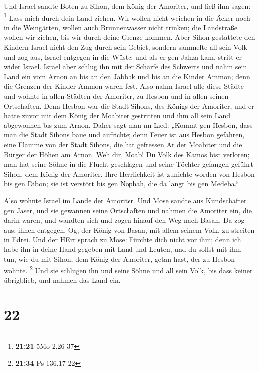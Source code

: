  Und Israel sandte Boten zu Sihon, dem König der
Amoriter, und ließ ihm sagen: \footnote{\textbf{21:21} 5Mo 2,26-37}
 Lass mich durch dein Land ziehen. Wir wollen nicht
weichen in die Äcker noch in die Weingärten, wollen auch Brunnenwasser
nicht trinken; die Landstraße wollen wir ziehen, bis wir durch deine
Grenze kommen.  Aber Sihon gestattete den Kindern Israel
nicht den Zug durch sein Gebiet, sondern sammelte all sein Volk und zog
aus, Israel entgegen in die Wüste; und als er gen Jahza kam, stritt er
wider Israel.  Israel aber schlug ihn mit der Schärfe des
Schwerts und nahm sein Land ein vom Arnon an bis an den Jabbok und bis
an die Kinder Ammon; denn die Grenzen der Kinder Ammon waren fest.
 Also nahm Israel alle diese Städte und wohnte in allen
Städten der Amoriter, zu Hesbon und in allen seinen Ortschaften.
 Denn Hesbon war die Stadt Sihons, des Königs der
Amoriter, und er hatte zuvor mit dem König der Moabiter gestritten und
ihm all sein Land abgewonnen bis zum Arnon.  Daher sagt
man im Lied: „Kommt gen Hesbon, dass man die Stadt Sihons baue und
aufrichte;  denn Feuer ist aus Hesbon gefahren, eine
Flamme von der Stadt Sihons, die hat gefressen Ar der Moabiter und die
Bürger der Höhen am Arnon.  Weh dir, Moab! Du Volk des
Kamos bist verloren; man hat seine Söhne in die Flucht geschlagen und
seine Töchter gefangen geführt Sihon, dem König der Amoriter.
 Ihre Herrlichkeit ist zunichte worden von Hesbon bis gen
Dibon; sie ist verstört bis gen Nophah, die da langt bis gen Medeba.``

 Also wohnte Israel im Lande der Amoriter.
 Und Mose sandte aus Kundschafter gen Jaser, und sie
gewannen seine Ortschaften und nahmen die Amoriter ein, die darin waren,
 und wandten sich und zogen hinauf den Weg nach Basan. Da
zog aus, ihnen entgegen, Og, der König von Basan, mit allem seinem Volk,
zu streiten in Edrei.  Und der HErr sprach zu Mose:
Fürchte dich nicht vor ihm; denn ich habe ihn in deine Hand gegeben mit
Land und Leuten, und du sollst mit ihm tun, wie du mit Sihon, dem König
der Amoriter, getan hast, der zu Hesbon wohnte. \footnote{\textbf{21:34}
  Ps 136,17-22}  Und sie schlugen ihn und seine Söhne und
all sein Volk, bis dass keiner übrigblieb, und nahmen das Land ein.

\hypertarget{section-21}{%
\section{22}\label{section-21}}

